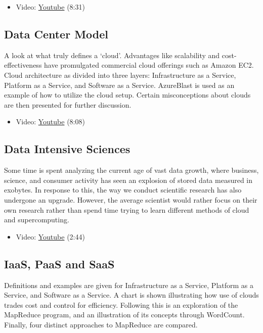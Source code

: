 \begin{itemize}
\tightlist
\item
  Video: \href{https://www.youtube.com/watch?v=5lKj8_nqj9k}{Youtube}
  (8:31)
\end{itemize}

\subsection{Data Center Model}\label{data-center-model}

A look at what truly defines a `cloud'. Advantages like scalability and
cost-effectiveness have promulgated commercial cloud offerings such as
Amazon EC2. Cloud architecture as divided into three layers:
Infrastructure as a Service, Platform as a Service, and Software as a
Service. AzureBlast is used as an example of how to utilize the cloud
setup. Certain misconceptions about clouds are then presented for
further discussion.

\begin{itemize}
\tightlist
\item
  Video: \href{https://www.youtube.com/watch?v=6Hq_LuLB-RU}{Youtube}
  (8:08)
\end{itemize}

\subsection{Data Intensive Sciences}\label{data-intensive-sciences}

Some time is spent analyzing the current age of vast data growth, where
business, science, and consumer activity has seen an explosion of stored
data measured in exobytes. In response to this, the way we conduct
scientific research has also undergone an upgrade. However, the average
scientist would rather focus on their own research rather than spend
time trying to learn different methods of cloud and supercomputing.

\begin{itemize}
\tightlist
\item
  Video: \href{https://www.youtube.com/watch?v=Ptoj3BME_z4}{Youtube}
  (2:44)
\end{itemize}

\subsection{IaaS, PaaS and SaaS}\label{iaas-paas-and-saas}

Definitions and examples are given for Infrastructure as a Service,
Platform as a Service, and Software as a Service. A chart is shown
illustrating how use of clouds trades cost and control for efficiency.
Following this is an exploration of the MapReduce program, and an
illustration of its concepts through WordCount. Finally, four distinct
approaches to MapReduce are compared.

